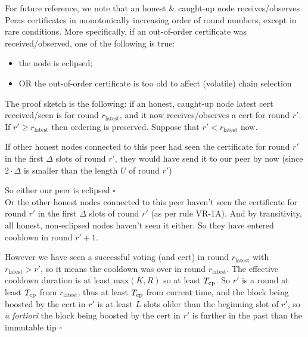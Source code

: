 For future reference, we note that an honest \& caught-up node receives/observes Peras certificates in monotonically increasing order of round numbers, except in rare conditions.
More specifically, if an out-of-order certificate was received/observed, one of the following is true:
\begin{itemize}
\item the node is eclipsed;
\item OR the out-of-order certificate is too old to affect (volatile) chain selection
\end{itemize}

The proof sketch is the following: if an honest, caught-up node latest cert received/seen is for round $r_{\text{latest}}$, and it now receives/observes a cert for round $r'$.
If $r' \geq r_{\text{latest}}$ then ordering is preserved. Suppose that $r' < r_{\text{latest}}$ now.

If other honest nodes connected to this peer had seen the certificate for round $r'$ in the first $\Delta$ slots of round $r'$, they would have send it to our peer by now (since $2 \cdot \Delta$ is smaller than the length $U$ of round $r'$)

So either our peer is eclipsed $\square$ \\

Or the other honest nodes connected to this peer haven't seen the certificate for round $r'$ in the first $\Delta$ slots of round $r'$ (as per rule VR-1A\cite{badertscher2025peras}). And by transitivity, all honest, non-eclipsed nodes haven't seen it either. So they have entered cooldown in round $r' + 1$.

However we have seen a successful voting (and cert) in round $r_{\text{latest}}$ with $r_{\text{latest}} > r'$, so it means the cooldown was over in round $r_{\text{latest}}$. The effective cooldown duration is at least $\text{max}(K, R)$ so at least $T_{\text{cp}}$. So $r'$ is a round at least $T_{\text{cp}}$ from $r_{\text{latest}}$, thus at least $T_{\text{cp}}$ from current time, and the block being boosted by the cert in $r'$ is at least $L$ slots older than the beginning slot of $r'$, so \textit{a fortiori} the block being boosted by the cert in $r'$ is further in the past than the immutable tip $\square$

